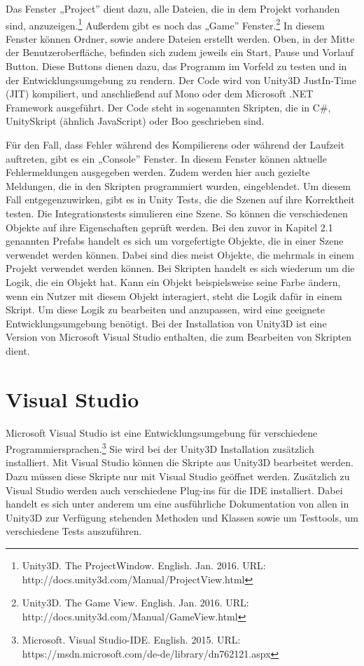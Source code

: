Das Fenster „Project” dient dazu, alle Dateien, die in dem Projekt vorhanden sind, anzuzeigen.\footnote{Unity3D. The ProjectWindow. English. Jan. 2016. URL: http://docs.unity3d.com/Manual/ProjectView.html} Außerdem gibt es noch das „Game” Fenster.\footnote{Unity3D. The Game View. English. Jan. 2016. URL: http://docs.unity3d.com/Manual/GameView.html} In diesem Fenster können Ordner, sowie andere Dateien erstellt werden. Oben, in der Mitte der Benutzeroberfläche, befinden sich zudem jeweils ein Start, Pause und Vorlauf Button. Diese Buttons dienen dazu, das Programm im Vorfeld zu testen und in der Entwicklungsumgebung zu rendern. Der Code wird von Unity3D JustIn-Time (JIT) kompiliert, und anschließend auf Mono oder dem Microsoft .NET Framework ausgeführt. Der Code steht in sogenannten Skripten, die in C\#, UnitySkript (ähnlich JavaScript) oder Boo geschrieben sind.

Für den Fall, dass Fehler während des Kompilierens oder während der Laufzeit auftreten, gibt es ein „Console” Fenster. In diesem Fenster können aktuelle Fehlermeldungen ausgegeben werden. Zudem werden hier auch gezielte Meldungen, die in den Skripten programmiert wurden, eingeblendet. Um diesem Fall entgegenzuwirken, gibt es in Unity Tests, die die Szenen auf ihre Korrektheit testen. Die Integrationstests simulieren eine Szene. So können die verschiedenen Objekte auf ihre Eigenschaften geprüft werden. Bei den zuvor in Kapitel 2.1 genannten Prefabs handelt es sich um vorgefertigte Objekte, die in einer Szene verwendet werden können. Dabei sind dies meist Objekte, die mehrmals in einem Projekt verwendet werden können. Bei Skripten handelt es sich wiederum um die Logik, die ein Objekt hat. Kann ein Objekt beispielsweise seine Farbe ändern, wenn ein Nutzer mit diesem Objekt interagiert, steht die Logik dafür in einem Skript. Um diese Logik zu bearbeiten und anzupassen, wird eine geeignete Entwicklungsumgebung benötigt. Bei der Installation von Unity3D ist eine Version von Microsoft Visual Studio enthalten, die zum Bearbeiten von Skripten dient.

\section{Visual Studio}

Microsoft Visual Studio ist eine Entwicklungsumgebung für verschiedene Programmiersprachen.\footnote{Microsoft. Visual Studio-IDE. English. 2015. URL: https://msdn.microsoft.com/de-de/library/dn762121.aspx} Sie wird bei der Unity3D Installation zusätzlich installiert. Mit Visual Studio können die Skripte aus Unity3D bearbeitet werden. Dazu müssen diese Skripte nur mit Visual Studio geöffnet werden. Zusätzlich zu Visual Studio werden auch verschiedene Plug-ins für die IDE installiert. Dabei handelt es sich unter anderem um eine ausführliche Dokumentation von allen in Unity3D zur Verfügung stehenden Methoden und Klassen sowie um Testtools, um verschiedene Tests auszuführen. 

